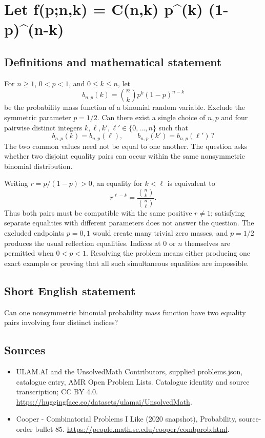 \documentclass[11pt,a4paper]{article}
\begin{document}
\section*{Let f(p;n,k) = C(n,k) p\textasciicircum{}(k) (1-p)\textasciicircum{}(n-k)}\label{statement}

\subsection{Definitions and mathematical statement}
For $n\ge1$, $0<p<1$, and $0\le k\le n$, let
\[
              b_{n,p}(k)=\binom nk p^k(1-p)^{n-k}
\]
be the probability mass function of a binomial random variable.
Exclude the symmetric parameter $p=1/2$. Can there exist a single
choice of $n,p$ and four pairwise distinct integers
$k,\ell,k',\ell'\in\{0,\ldots,n\}$ such that
\[
           b_{n,p}(k)=b_{n,p}(\ell),
                  \qquad
           b_{n,p}(k')=b_{n,p}(\ell')\,?
\]
The two common values need not be equal to one another. The
question asks whether two disjoint equality pairs can occur
within the same nonsymmetric binomial distribution.

Writing $r=p/(1-p)>0$, an equality for $k<\ell$ is equivalent to
\[
                r^{\ell-k}=\frac{\binom nk}{\binom n\ell}.
\]
Thus both pairs must be compatible with the same positive
$r\ne1$; satisfying separate equalities with different parameters
does not answer the question. The excluded endpoints $p=0,1$
would create many trivial zero masses, and $p=1/2$ produces
the usual reflection equalities. Indices at $0$ or $n$ themselves
are permitted when $0<p<1$. Resolving the problem means either
producing one exact example or proving that all such simultaneous
equalities are impossible.
\subsection{Short English statement}
Can one nonsymmetric binomial probability mass function have two equality pairs involving four distinct indices?
\subsection{Sources}
\begin{itemize}
\item[S1] ULAM.AI and the UnsolvedMath Contributors, supplied problems.json, catalogue entry, AMR Open Problem Lists. Catalogue identity and source transcription; CC BY 4.0.
\url{https://huggingface.co/datasets/ulamai/UnsolvedMath}.
\item[S2] Cooper - Combinatorial Problems I Like (2020 snapshot), Probability, source-order bullet 85. 
\url{https://people.math.sc.edu/cooper/combprob.html}.
\end{itemize}
\end{document}
